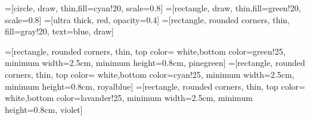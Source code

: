 \setlength\PreviewBorder{7pt}
=[circle, draw, thin,fill=cyan!20, scale=0.8]
=[rectangle, draw, thin,fill=green!20, scale=0.8]
=[ultra thick, red, opacity=0.4]
=[rectangle, rounded corners, thin, 
  fill=gray!20, text=blue, draw]

=[rectangle, rounded corners, thin,
  top color= white,bottom color=green!25,
  minimum width=2.5cm, minimum height=0.8cm,
  pinegreen]
=[rectangle, rounded corners, thin,
  top color= white,bottom color=cyan!25,
  minimum width=2.5cm, minimum height=0.8cm,
  royalblue]
=[rectangle, rounded corners, thin,
  top color= white,bottom color=lavander!25,
  minimum width=2.5cm, minimum height=0.8cm,
  violet]
